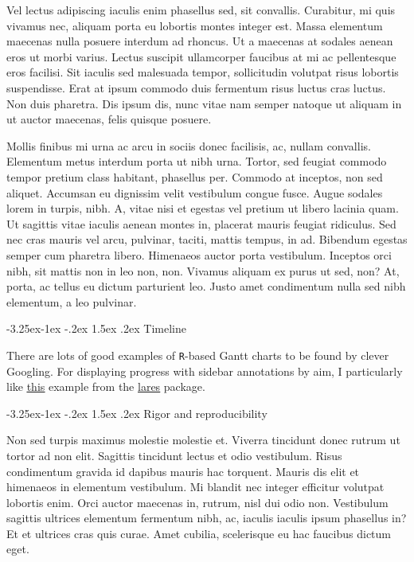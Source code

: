 \documentclass[11pt,]{article}
\makeatletter
\renewcommand\subsubsection{
  \@startsection{subsubsection}{3}{\z@}
    {-3.25ex\@plus -1ex \@minus -.2ex}
    {1.5ex \@plus .2ex}
    {\normalfont\normalsize\bf}} %
\makeatother
\begin{document}
Vel lectus adipiscing iaculis enim phasellus sed, sit convallis.
Curabitur, mi quis vivamus nec, aliquam porta eu lobortis montes integer
est. Massa elementum maecenas nulla posuere interdum ad rhoncus. Ut a
maecenas at sodales aenean eros ut morbi varius. Lectus suscipit
ullamcorper faucibus at mi ac pellentesque eros facilisi. Sit iaculis
sed malesuada tempor, sollicitudin volutpat risus lobortis suspendisse.
Erat at ipsum commodo duis fermentum risus luctus cras luctus. Non duis
pharetra. Dis ipsum dis, nunc vitae nam semper natoque ut aliquam in ut
auctor maecenas, felis quisque posuere.

Mollis finibus mi urna ac arcu in sociis donec facilisis, ac, nullam
convallis. Elementum metus interdum porta ut nibh urna. Tortor, sed
feugiat commodo tempor pretium class habitant, phasellus per. Commodo at
inceptos, non sed aliquet. Accumsan eu dignissim velit vestibulum congue
fusce. Augue sodales lorem in turpis, nibh. A, vitae nisi et egestas vel
pretium ut libero lacinia quam. Ut sagittis vitae iaculis aenean montes
in, placerat mauris feugiat ridiculus. Sed nec cras mauris vel arcu,
pulvinar, taciti, mattis tempus, in ad. Bibendum egestas semper cum
pharetra libero. Himenaeos auctor porta vestibulum. Inceptos orci nibh,
sit mattis non in leo non, non. Vivamus aliquam ex purus ut sed, non?
At, porta, ac tellus eu dictum parturient leo. Justo amet condimentum
nulla sed nibh elementum, a leo pulvinar.

\hypertarget{timeline}{%
\subsubsection{Timeline}\label{timeline}}

There are lots of good examples of \texttt{R}-based Gantt charts to be
found by clever Googling. For displaying progress with sidebar
annotations by aim, I particularly like
\href{https://datascienceplus.com/visualize-your-cvs-timeline-with-r-gantt-style/}{\underline{this}}
example from the
\href{https://github.com/laresbernardo/lares}{\underline{lares}}
package.

\hypertarget{rigor-and-reproducibility}{%
\subsubsection{Rigor and
reproducibility}\label{rigor-and-reproducibility}}

Non sed turpis maximus molestie molestie et. Viverra tincidunt donec
rutrum ut tortor ad non elit. Sagittis tincidunt lectus et odio
vestibulum. Risus condimentum gravida id dapibus mauris hac torquent.
Mauris dis elit et himenaeos in elementum vestibulum. Mi blandit nec
integer efficitur volutpat lobortis enim. Orci auctor maecenas in,
rutrum, nisl dui odio non. Vestibulum sagittis ultrices elementum
fermentum nibh, ac, iaculis iaculis ipsum phasellus in? Et et ultrices
cras quis curae. Amet cubilia, scelerisque eu hac faucibus dictum eget.
\end{document}
